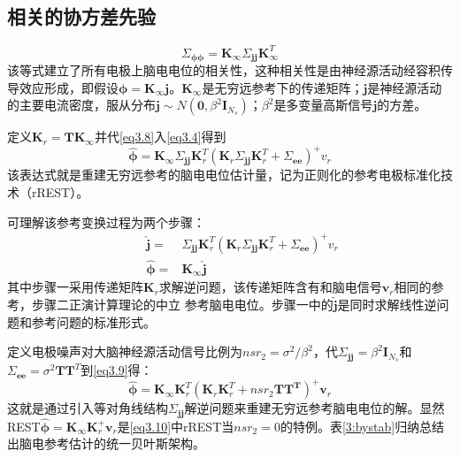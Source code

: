 \subsection{相关的协方差先验}
\begin{equation}\label{eq3.8}
\Sigma_{\mathbf{\phi\phi}}=\mathbf{K}_{\infty}\Sigma_{\mathbf{jj}}\mathbf{K}_{\infty}^T
\end{equation}
该等式建立了所有电极上脑电电位的相关性，这种相关性是由神经源活动经容积传导效应形成，即假设$\mathbf{\phi}=\mathbf{K}_{\infty}\mathbf{j}$。$\mathbf{K}_\infty$是无穷远参考下的传递矩阵；$\mathbf{j}$是神经源活动的主要电流密度，服从分布$\mathbf{j}\sim{N(\mathbf{0},\beta^2\mathbf{I}_{N_s})}$；$\beta^{2}$是多变量高斯信号$\mathbf{j}$的方差。

定义$\mathbf{K}_r=\mathbf{TK}_{\infty}$并代\eqref{eq3.8}入\eqref{eq3.4}得到
\begin{equation}\label{eq3.9}
\hat{\mathbf{\phi}}=\mathbf{K}_\infty\Sigma_{\mathbf{jj}}\mathbf{K}_r^T(\mathbf{K}_r\Sigma_{\mathbf{jj}}\mathbf{K}_r^T+\Sigma_{\mathbf{ee}})^+v_r
\end{equation}
该表达式就是重建无穷远参考的脑电电位估计量，记为正则化的参考电极标准化技术（rREST）。

可理解该参考变换过程为两个步骤：
\begin{align*}
\qquad\hat{\mathbf{j}}={} &\Sigma_{\mathbf{jj}}\mathbf{K}_{r}^T(\mathbf{K}_{r}\Sigma_{\mathbf{jj}}\mathbf{K}_r^T+\Sigma_{\mathbf{ee}})^+v_r\\
\qquad\hat{\mathbf{\phi}}={} &\mathbf{K}_{\infty}\hat{\mathbf{j}}
\end{align*}
其中步骤一采用传递矩阵$\mathbf{K}_{r}$求解逆问题，该传递矩阵含有和脑电信号$\mathbf{v}_{r}$相同的参考，步骤二正演计算理论的中立
参考脑电电位。步骤一中的$\hat{\mathbf{j}}$是同时求解线性逆问题和参考问题的标准形式。

定义电极噪声对大脑神经源活动信号比例为$nsr_{2}=\sigma^{2}/\beta^{2}$，代$\Sigma_{\mathbf{jj}}=\beta^{2}\mathbf{I}_{N_s}$和$\Sigma_{\mathbf{ee}}=\sigma^{2}\mathbf{TT}^T$到\eqref{eq3.9}得：
\begin{equation}\label{eq3.10}
\hat{\mathbf{\phi}}=\mathbf{K}_{\infty}\mathbf{K}_{r}^{T}(\mathbf{K}_{r}\mathbf{K}_{r}^{T}+nsr_{2}\mathbf{TT^{T}})^{+}\mathbf{v}_{r}
\end{equation}
这就是通过引入等对角线结构$\Sigma_{\mathbf{jj}}$解逆问题来重建无穷远参考脑电电位的解。显然REST$\hat{\mathbf{\phi}}=\mathbf{K}_{\infty}\mathbf{K}_{r}^{+}\mathbf{v}_{r}$是\eqref{eq3.10}中rREST当$nsr_{2}=0$的特例。表\ref{3:bystab}归纳总结出脑电参考估计的统一贝叶斯架构。

